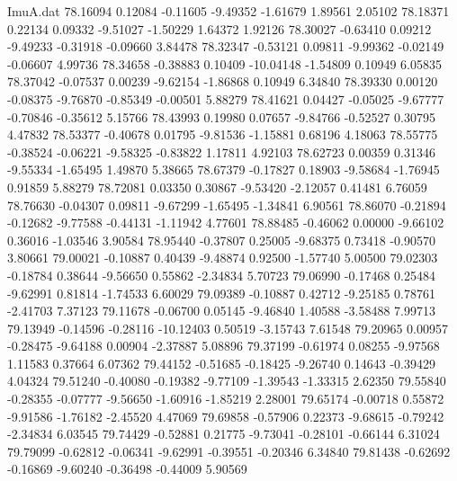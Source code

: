 \begin{filecontents}{ImuA.dat}
  78.16094    0.12084   -0.11605   -9.49352   -1.61679    1.89561    2.05102
  78.18371    0.22134    0.09332   -9.51027   -1.50229    1.64372    1.92126
  78.30027   -0.63410    0.09212   -9.49233   -0.31918   -0.09660    3.84478
  78.32347   -0.53121    0.09811   -9.99362   -0.02149   -0.06607    4.99736
  78.34658   -0.38883    0.10409  -10.04148   -1.54809    0.10949    6.05835
  78.37042   -0.07537    0.00239   -9.62154   -1.86868    0.10949    6.34840
  78.39330    0.00120   -0.08375   -9.76870   -0.85349   -0.00501    5.88279
  78.41621    0.04427   -0.05025   -9.67777   -0.70846   -0.35612    5.15766
  78.43993    0.19980    0.07657   -9.84766   -0.52527    0.30795    4.47832
  78.53377   -0.40678    0.01795   -9.81536   -1.15881    0.68196    4.18063
  78.55775   -0.38524   -0.06221   -9.58325   -0.83822    1.17811    4.92103
  78.62723    0.00359    0.31346   -9.55334   -1.65495    1.49870    5.38665
  78.67379   -0.17827    0.18903   -9.58684   -1.76945    0.91859    5.88279
  78.72081    0.03350    0.30867   -9.53420   -2.12057    0.41481    6.76059
  78.76630   -0.04307    0.09811   -9.67299   -1.65495   -1.34841    6.90561
  78.86070   -0.21894   -0.12682   -9.77588   -0.44131   -1.11942    4.77601
  78.88485   -0.46062    0.00000   -9.66102    0.36016   -1.03546    3.90584
  78.95440   -0.37807    0.25005   -9.68375    0.73418   -0.90570    3.80661
  79.00021   -0.10887    0.40439   -9.48874    0.92500   -1.57740    5.00500
  79.02303   -0.18784    0.38644   -9.56650    0.55862   -2.34834    5.70723
  79.06990   -0.17468    0.25484   -9.62991    0.81814   -1.74533    6.60029
  79.09389   -0.10887    0.42712   -9.25185    0.78761   -2.41703    7.37123
  79.11678   -0.06700    0.05145   -9.46840    1.40588   -3.58488    7.99713
  79.13949   -0.14596   -0.28116  -10.12403    0.50519   -3.15743    7.61548
  79.20965    0.00957   -0.28475   -9.64188    0.00904   -2.37887    5.08896
  79.37199   -0.61974    0.08255   -9.97568    1.11583    0.37664    6.07362
  79.44152   -0.51685   -0.18425   -9.26740    0.14643   -0.39429    4.04324
  79.51240   -0.40080   -0.19382   -9.77109   -1.39543   -1.33315    2.62350
  79.55840   -0.28355   -0.07777   -9.56650   -1.60916   -1.85219    2.28001
  79.65174   -0.00718    0.55872   -9.91586   -1.76182   -2.45520    4.47069
  79.69858   -0.57906    0.22373   -9.68615   -0.79242   -2.34834    6.03545
  79.74429   -0.52881    0.21775   -9.73041   -0.28101   -0.66144    6.31024
  79.79099   -0.62812   -0.06341   -9.62991   -0.39551   -0.20346    6.34840
  79.81438   -0.62692   -0.16869   -9.60240   -0.36498   -0.44009    5.90569

\end{filecontents}
